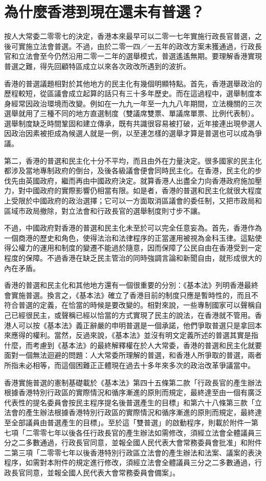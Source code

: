 \section{為什麼香港到現在還未有普選？}
\label{sec:sec34}

按人大常委二零零七的決定，香港本來最早可以二零一七年實施行政長官普選，之後可實施立法會普選。不過，由於二零一四／一五年的政改方案未獲通過，行政長官和立法會至今仍然沿用二零一二年的選舉模式，普選遙遙無期。要理解香港實現普選之難，得先回顧特區成立以來各次政改所遇到的波折。

香港的普選議題相對於其他地方的民主化有幾個明顯特點。首先，香港選舉政治的歷程較短，從區議會成立起算的話只有三十多年歷史。而在這過程中，選舉制度本身經常因政治環境而改變。例如在一九九一年至一九九八年期間，立法機關的三次選舉就用了三種不同的地方直選制度（雙議席雙票、單議席單票、比例代表制）。選舉制度缺乏時間鞏固和建立傳承，既有共識很容易被打破，近年接連出現參選人因政治因素被拒成為候選人就是一例，以至連怎樣的選舉才算是普選也可以成為爭議。

第二，香港的普選和民主化十分不平均，而且由外在力量決定。很多國家的民主化都涉及當地專制政府的倒台，及後各級議會便會同時民主化。在香港，民主化的步伐先由英國政府，繼而再由中國政府決定。就算香港人出盡全力向香港政府施加壓力，對中國政府的實際影響仍相當有限。如是者，香港的普選和民主化就很大程度上受限於中國政府的政治選擇；它可以一方面取消區議會的委任制，又把市政局和區域市政局撤除，對立法會和行政長官的選舉制度則寸步不讓。

不過，中國政府對香港的普選和民主化未至於可以完全任意妄為。首先，香港作為一個商港的歷史和角色，使得法治和法律程序的正當運用被視為金科玉律。這點使得公權力的運用和制度的變遷不能過於隨意，因而保障了公民自由在香港受到一定程度的保障。不過香港在缺乏民主管治的同時強調言論和新聞自由，就形成很大的內在矛盾。

香港的普選和民主化和其他地方還有一個很重要的分別：《基本法》列明香港最終會實施普選。換言之，《基本法》確立了香港目前的制度只應是暫時性的，而且不符合普選的定義，在恰當的時候是要改變的。相對來說，一些專制國家可以聲稱自己已經很民主，或聲稱已經以恰當的方式實現了民主的說法，在香港就不管用。香港人可以按《基本法》義正辭嚴的申明普選是一個承諾，他們爭取普選只是拿回本來應得的權利。當然，反過來說，《基本法》並沒有明文定義所述的普選其實是指什麼，而考慮到《基本法》的最終解釋權在於人大常委，香港的普選和民主化就要面對一個無法迴避的問題：人大常委所理解的普選，和香港人所爭取的普選，兩者所指未必相等，而這個困難正正體現在過去十多年來多次的政治改革爭議當中。

香港實施普選的憲制基礎載於《基本法》第四十五條第二款「行政長官的產生辦法根據香港特別行政區的實際情況和循序漸進的原則而規定，最終達至由一個有廣泛代表性的提名委員會按民主程序提名後普選產生的目標」和第六十八條第三款「立法會的產生辦法根據香港特別行政區的實際情況和循序漸進的原則而規定，最終達至全部議員由普選產生的目標」。至於這「雙普選」的啟動程序，則載於附件一第七項「二零零七年以後各任行政長官的產生辦法如需修改，須經立法會全體議員三分之二多數通過，行政長官同意，並報全國人民代表大會常務委員會批准」和附件二第三項「二零零七年以後香港特別行政區立法會的產生辦法和法案、議案的表決程序，如需對本附件的規定進行修改，須經立法會全體議員三分之二多數通過，行政長官同意，並報全國人民代表大會常務委員會備案」。

